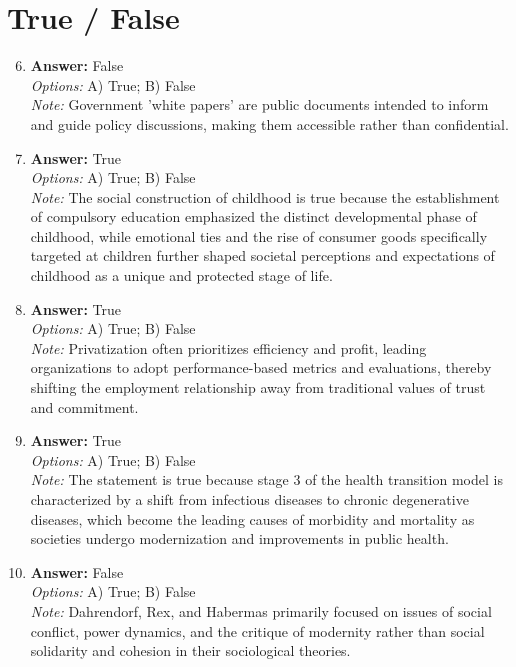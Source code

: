 \documentclass[12pt]{article}
\begin{document}
\section*{True / False}
\begin{enumerate}[label=\arabic*.]
\setcounter{enumi}{5}
\item \textbf{Answer:} False
\\ \textit{Options:} A) True; B) False
\\ \textit{Note:} Government 'white papers' are public documents intended to inform and guide policy discussions, making them accessible rather than confidential.
\item \textbf{Answer:} True
\\ \textit{Options:} A) True; B) False
\\ \textit{Note:} The social construction of childhood is true because the establishment of compulsory education emphasized the distinct developmental phase of childhood, while emotional ties and the rise of consumer goods specifically targeted at children further shaped societal perceptions and expectations of childhood as a unique and protected stage of life.
\item \textbf{Answer:} True
\\ \textit{Options:} A) True; B) False
\\ \textit{Note:} Privatization often prioritizes efficiency and profit, leading organizations to adopt performance-based metrics and evaluations, thereby shifting the employment relationship away from traditional values of trust and commitment.
\item \textbf{Answer:} True
\\ \textit{Options:} A) True; B) False
\\ \textit{Note:} The statement is true because stage 3 of the health transition model is characterized by a shift from infectious diseases to chronic degenerative diseases, which become the leading causes of morbidity and mortality as societies undergo modernization and improvements in public health.
\item \textbf{Answer:} False
\\ \textit{Options:} A) True; B) False
\\ \textit{Note:} Dahrendorf, Rex, and Habermas primarily focused on issues of social conflict, power dynamics, and the critique of modernity rather than social solidarity and cohesion in their sociological theories.
\end{enumerate}
\end{document}
